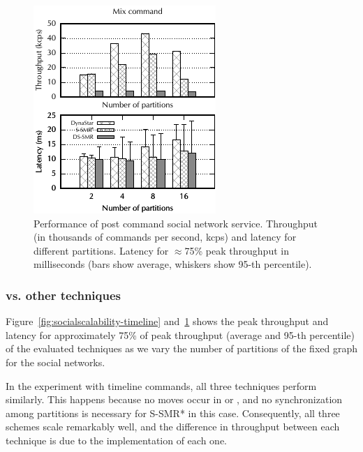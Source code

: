 \begin{figure}[ht!]
  \centering
    \includegraphics[width=0.6\columnwidth]{figures/experiments/dynastar/chirper-compare-mix}
  \caption{Performance of post command social network service. Throughput (in
  thousands of commands per second, kcps) and latency for different partitions.
  Latency for $\approx$75\% peak throughput in milliseconds (bars show average,
  whiskers show 95-th percentile).}
  \label{fig:socialscalability-mix}
\end{figure}

\subsubsection{\dynastar vs. other techniques}
\label{sec:dynastar-evaluation:results}

Figure~\ref{fig:socialscalability-timeline} and~\ref{fig:socialscalability-mix}
shows the peak throughput and latency for approximately 75\% of peak throughput
(average and 95-th percentile) of the evaluated techniques as we vary the number
of partitions of the fixed graph for the social networks.

In the experiment with timeline commands, all three techniques perform
similarly. This happens because no moves occur in \dynastar or \dssmr{}, and no
synchronization among partitions is necessary for S-SMR* in this case.
Consequently, all three schemes scale remarkably well, and the difference in
throughput between each technique is due to the implementation of each one.


